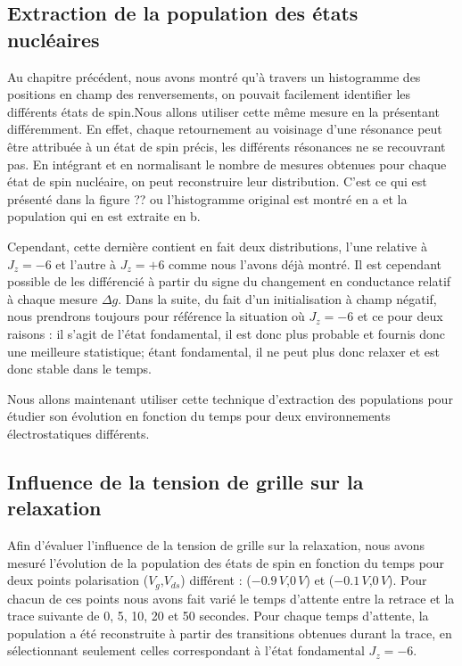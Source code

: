 \subsection{Extraction de la population des états nucléaires}

Au chapitre précédent, nous avons montré qu'à travers un histogramme des positions en champ des renversements, on pouvait facilement identifier les différents états de spin.Nous allons utiliser cette m\^eme mesure en la présentant différemment. En effet, chaque retournement au voisinage d'une résonance peut \^etre attribuée à un état de spin précis, les différents résonances ne se recouvrant pas. En intégrant et en normalisant le nombre de mesures obtenues pour chaque état de spin nucléaire, on peut reconstruire leur distribution. C'est ce qui est présenté dans la figure ?? ou l'histogramme original est montré en a et la population qui en est extraite en b.

Cependant, cette dernière contient en fait deux distributions, l'une relative à $J_z=-6$ et l'autre à $J_z=+6$ comme nous l'avons déjà montré. Il est cependant possible de les différencié à partir du signe du changement en conductance relatif à chaque mesure $\Delta g$. Dans la suite, du fait d'un initialisation à champ négatif, nous prendrons toujours pour référence la situation où $J_z=-6$ et ce pour deux raisons : il s'agit de l'état fondamental, il est donc plus probable et fournis donc une meilleure statistique; étant fondamental, il ne peut plus donc relaxer et est donc stable dans le temps.

Nous allons maintenant utiliser cette technique d'extraction des populations pour étudier son évolution en fonction du temps pour deux environnements électrostatiques différents.

\subsection{Influence de la tension de grille sur la relaxation}
Afin d'évaluer l'influence de la tension de grille sur la relaxation, nous avons mesuré l'évolution de la population des états de spin en fonction du temps pour deux points polarisation ($V_g$,$V_{ds}$) différent : ($-0.9\, V$,$0\, V$) et ($-0.1\, V$,$0\, V$). Pour chacun de ces points nous avons fait varié le temps d'attente entre la retrace et la trace suivante de 0, 5, 10, 20 et 50 secondes. Pour chaque temps d'attente, la population a été reconstruite à partir des transitions obtenues durant la trace, en sélectionnant seulement celles correspondant à l'état fondamental $J_z=-6$.

